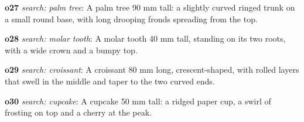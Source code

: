 {\noindent\textbf{o27} \emph{search: palm tree}: A palm tree 90 mm tall: a slightly curved ringed trunk on a small round base, with long drooping fronds spreading from the top.\par
\noindent\textbf{o28} \emph{search: molar tooth}: A molar tooth 40 mm tall, standing on its two roots, with a wide crown and a bumpy top.\par
\noindent\textbf{o29} \emph{search: croissant}: A croissant 80 mm long, crescent-shaped, with rolled layers that swell in the middle and taper to the two curved ends.\par
\noindent\textbf{o30} \emph{search: cupcake}: A cupcake 50 mm tall: a ridged paper cup, a swirl of frosting on top and a cherry at the peak.\par
}
